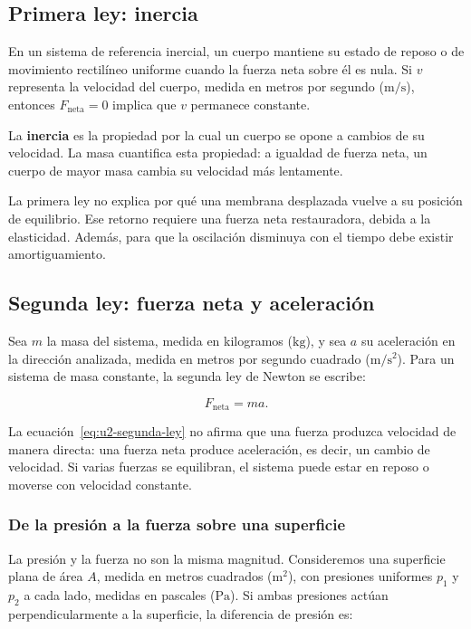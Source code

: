 \subsection{Primera ley: inercia}
\label{sec:u2-primera-ley}

En un sistema de referencia inercial, un cuerpo mantiene su estado de reposo o de movimiento rectilíneo uniforme cuando la fuerza neta sobre él es nula. Si \(v\) representa la velocidad del cuerpo, medida en metros por segundo (\(\text{m}/\text{s}\)), entonces \(F_\mathrm{neta}=0\) implica que \(v\) permanece constante.

La \textbf{inercia} es la propiedad por la cual un cuerpo se opone a cambios de su velocidad. La masa cuantifica esta propiedad: a igualdad de fuerza neta, un cuerpo de mayor masa cambia su velocidad más lentamente.

La primera ley no explica por qué una membrana desplazada vuelve a su posición de equilibrio. Ese retorno requiere una fuerza neta restauradora, debida a la elasticidad. Además, para que la oscilación disminuya con el tiempo debe existir amortiguamiento.

\subsection{Segunda ley: fuerza neta y aceleración}
\label{sec:u2-segunda-ley}

Sea \(m\) la masa del sistema, medida en kilogramos (\(\text{kg}\)), y sea \(a\) su aceleración en la dirección analizada, medida en metros por segundo cuadrado (\(\text{m}/\text{s}^{2}\)). Para un sistema de masa constante, la segunda ley de Newton se escribe:

\begin{equation}
    F_\mathrm{neta}=ma.
    \label{eq:u2-segunda-ley}
\end{equation}

La ecuación~\eqref{eq:u2-segunda-ley} no afirma que una fuerza produzca velocidad de manera directa: una fuerza neta produce aceleración, es decir, un cambio de velocidad. Si varias fuerzas se equilibran, el sistema puede estar en reposo o moverse con velocidad constante.

\subsubsection*{De la presión a la fuerza sobre una superficie}

La presión y la fuerza no son la misma magnitud. Consideremos una superficie plana de área \(A\), medida en metros cuadrados (\(\text{m}^{2}\)), con presiones uniformes \(p_1\) y \(p_2\) a cada lado, medidas en pascales (\(\text{Pa}\)). Si ambas presiones actúan perpendicularmente a la superficie, la diferencia de presión es:

